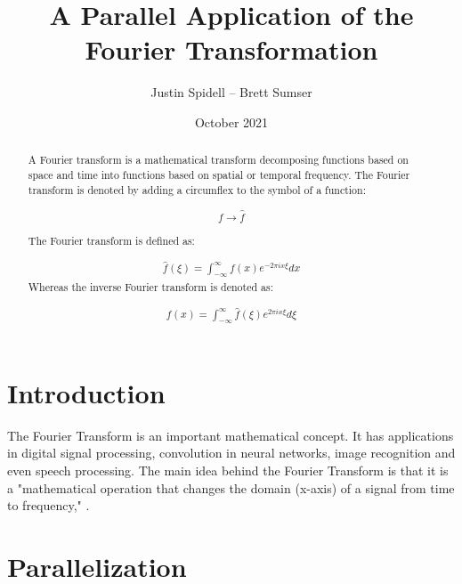 \documentclass[12pt]{extarticle}
\title{A Parallel Application of the Fourier Transformation}
\author{Justin Spidell -- Brett Sumser}
\date{October 2021}
\begin{document}
 
\maketitle
\newpage
\begin{abstract}

A Fourier transform is a mathematical transform decomposing functions based on space and time into functions based on spatial or temporal frequency. The Fourier transform is denoted by adding a circumflex to the symbol of a function:

\begin{align*}
f \rightarrow \hat{f}
\end{align*}

The Fourier transform is defined as:

\begin{align}
\hat{f} (\xi)= \int^{\infty}_{-\infty}f(x) e^{-2 \pi i x \xi}dx
\end{align}
Whereas the inverse Fourier transform is denoted as:

\begin{align}
{f} (x)= \int^{\infty}_{-\infty}\hat{f}(\xi) e^{2 \pi i x \xi}d\xi
\end{align}

\end{abstract}


\maketitle
\newpage
\section*{Introduction}

    The Fourier Transform is an important mathematical concept. It has applications
    in digital signal processing, convolution in neural networks, image recognition and even speech processing.
    The main idea behind the Fourier Transform is that it is a 
    "mathematical operation that changes the domain (x-axis) of a signal from time to frequency," \cite{Maklin:2019}. 

\maketitle
\newpage
\section*{Parallelization} 
    
\end{document}
